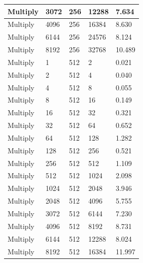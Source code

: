 \documentclass{article}
\begin{document}
\begin{longtable}{|l|l|l|l|l|}
Multiply           & 3072 & 256         & 12288             & 7.634             \\ \hline
Multiply           & 4096 & 256         & 16384             & 8.630             \\ \hline
Multiply           & 6144 & 256         & 24576             & 8.124             \\ \hline
Multiply           & 8192 & 256         & 32768             & 10.489            \\ \hline
Multiply           & 1    & 512         & 2                 & 0.021             \\ \hline
Multiply           & 2    & 512         & 4                 & 0.040             \\ \hline
Multiply           & 4    & 512         & 8                 & 0.055             \\ \hline
Multiply           & 8    & 512         & 16                & 0.149             \\ \hline
Multiply           & 16   & 512         & 32                & 0.321             \\ \hline
Multiply           & 32   & 512         & 64                & 0.652             \\ \hline
Multiply           & 64   & 512         & 128               & 1.282             \\ \hline
Multiply           & 128  & 512         & 256               & 0.521             \\ \hline
Multiply           & 256  & 512         & 512               & 1.109             \\ \hline
Multiply           & 512  & 512         & 1024              & 2.098             \\ \hline
Multiply           & 1024 & 512         & 2048              & 3.946             \\ \hline
Multiply           & 2048 & 512         & 4096              & 5.755             \\ \hline
Multiply           & 3072 & 512         & 6144              & 7.230             \\ \hline
Multiply           & 4096 & 512         & 8192              & 8.731             \\ \hline
Multiply           & 6144 & 512         & 12288             & 8.024             \\ \hline
Multiply           & 8192 & 512         & 16384             & 11.997            \\ \hline

\end{longtable}
\end{document}

